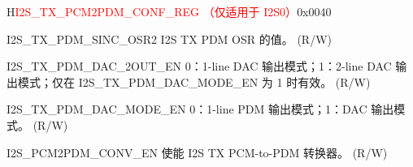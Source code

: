 \begin{register}{H}{\textcolor{red}{I2S\_TX\_PCM2PDM\_CONF\_REG （仅适用于 I2S0）}}{0x{}0040}\label{regdesc:I2STXPCM2PDMCONFREG}
%
%
%
%
%
%
%
\regnewline%
\begin{regdesc}\begin{reglist}
\label{fielddesc:I2STXPDMSINCOSR2}\item [I2S\_TX\_PDM\_SINC\_OSR2] I2S TX PDM OSR 的值。 (R/W)
\label{fielddesc:I2STXPDMDAC2OUTEN}\item [I2S\_TX\_PDM\_DAC\_2OUT\_EN] 0：1-line DAC 输出模式；1：2-line DAC 输出模式；仅在 I2S\_TX\_PDM\_DAC\_MODE\_EN 为 1 时有效。 (R/W)
\label{fielddesc:I2STXPDMDACMODEEN}\item [I2S\_TX\_PDM\_DAC\_MODE\_EN] 0：1-line PDM 输出模式；1：DAC 输出模式。 (R/W)
\label{fielddesc:I2SPCM2PDMCONVEN}\item [I2S\_PCM2PDM\_CONV\_EN] 使能 I2S TX PCM-to-PDM 转换器。 (R/W)
\end{reglist}\end{regdesc}
\end{register}


